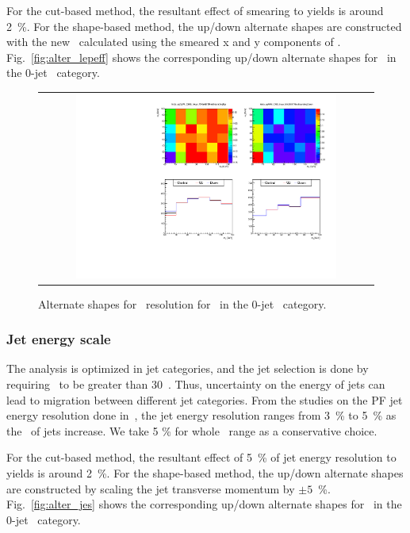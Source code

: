 For the cut-based method, the resultant effect of smearing to yields is around 2~\%. 
For the shape-based method, the up/down alternate shapes are constructed 
with the new \mT\ calculated using the smeared x and y components of \met.
Fig.~\ref{fig:alter_lepeff} shows the corresponding up/down alternate shapes
for \qqww\ in the 0-jet \DF\ category. 

%
\begin{figure}[htp]
\centering
\begin{tabular}{c}
\includegraphics[width=0.8\textwidth]{figures/histo_qqWW_CMS_hww_MVAMETResBounding_0j_zoom.pdf}
\end{tabular}
\caption{Alternate shapes for \met\ resolution for \qqww\ in the 0-jet \DF\ category.}
\label{fig:alter_metres}
\end{figure}

\subsubsection{Jet energy scale} 

The analysis is optimized in jet categories, and the jet selection is done by 
requiring \pt\ to be greater than 30~\GeV. Thus, uncertainty on the 
energy of jets can lead to migration between different jet categories.  
From the studies on the PF jet energy resolution done in~\cite{Chatrchyan:2011ds}, 
the jet energy resolution ranges from 3~\% to 5~\% as the \Eta\ of jets increase. 
We take 5 \% for whole \Eta\ range as a conservative choice.   

For the cut-based method, the resultant effect of 5~\% of jet energy resolution 
to yields is around 2~\%. 
For the shape-based method, the up/down alternate shapes are constructed
by scaling the jet transverse momentum by $\pm 5$~\%.
Fig.~\ref{fig:alter_jes} shows the corresponding up/down alternate shapes
for \qqww\ in the 0-jet \DF\ category. 

